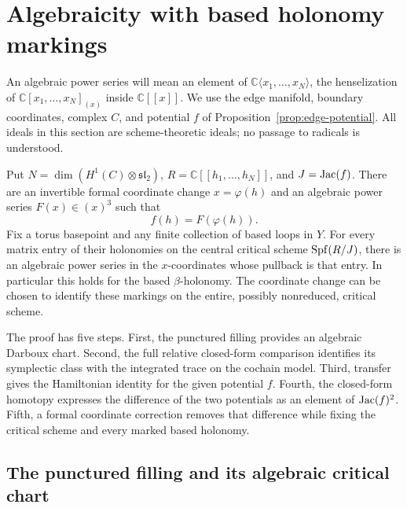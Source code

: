 \section{Algebraicity with based holonomy markings}
\label{sec:algebraicity}

An algebraic power series will mean an element of
\(\mathbb C\langle x_1,\ldots,x_N\rangle\), the henselization of
\(\mathbb C[x_1,\ldots,x_N]_{(x)}\) inside \(\mathbb C[[x]]\).
We use the edge manifold, boundary coordinates, complex \(C\), and potential
\(f\) of Proposition~\ref{prop:edge-potential}.  All ideals in this section
are scheme-theoretic ideals; no passage to radicals is understood.

\begin{theorem}
\label{thm:edge-algebraicity}
Put \(N=\dim(H^1(C)\otimes\mathfrak{sl}_2)\),
\(R=\mathbb C[[h_1,\ldots,h_N]]\), and \(J=\operatorname{Jac}(f)\).
There are an invertible formal coordinate change \(x=\varphi(h)\) and an
algebraic power series \(F(x)\in(x)^3\) such that
\[
                         f(h)=F(\varphi(h)).
\]
Fix a torus basepoint and any finite collection of based loops in \(Y\).
For every matrix entry of their holonomies on the central critical scheme
\(\operatorname{Spf}(R/J)\), there is an algebraic power series in the \(x\)-coordinates
whose pullback is that entry.  In particular this holds for the based
\(\beta\)-holonomy.  The coordinate change can be chosen to identify these
markings on the entire, possibly nonreduced, critical scheme.
\end{theorem}

The proof has five steps.  First, the punctured filling provides an
algebraic Darboux chart.  Second, the full relative closed-form comparison
identifies its symplectic class with the integrated trace on the cochain
model.  Third, transfer gives the Hamiltonian identity for the given
potential \(f\).  Fourth, the closed-form homotopy expresses the
difference of the two potentials as an element of \(\operatorname{Jac}(f)^2\).
Fifth, a formal coordinate correction removes that difference while
fixing the critical scheme and every marked based holonomy.

\subsection{The punctured filling and its algebraic critical chart}

